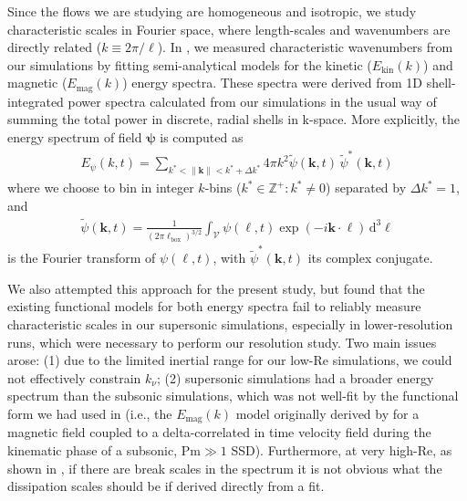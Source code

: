 \documentclass[12pt,twoside]{extreport}
\newcommand{\rbrac}[1]{\left( #1 \right)} %
\newcommand{\mVector}[1]{\bm{#1}} %
\newcommand{\mdd}[1]{\mathrm{d} #1}
\newcommand{\mReh}{\ensuremath{\mathrm{Re}}} %
\newcommand{\mPrm}{\ensuremath{\mathrm{Pm}}} %
\newcommand{\mVolume}{\ensuremath{\mathcal{V}}} %
\newcommand{\ie}{i.e.,\xspace} %
\providecommand{\DIFaddtex}[1]{{\protect\color{DIFgreen}\uwave{#1}}} %
\providecommand{\DIFaddbegin}{} %
\providecommand{\DIFaddend}{} %
\providecommand{\DIFadd}[1]{\texorpdfstring{\DIFaddtex{#1}}{#1}} %
\providecommand{\DIFaddincludegraphics}[2][]{{\color{DIFgreen}\fbox{\DIFOincludegraphics[#1]{#2}}}} %
\DeclareRobustCommand{\DIFaddbegin}{\DIFOaddbegin \let\includegraphics\DIFaddincludegraphics} %
\DeclareRobustCommand{\DIFaddend}{\DIFOaddend \let\includegraphics\DIFOincludegraphics} %
\begin{document}
Since the flows we are studying are homogeneous and isotropic, we study characteristic scales in Fourier space, where length-scales and wavenumbers are directly related ($k \equiv 2\pi / \ell$). In , we measured characteristic wavenumbers from our simulations by fitting semi-analytical models for the kinetic ($E_\mathrm{kin}(k)$) and magnetic ($E_\mathrm{mag}(k)$) energy spectra. These spectra were derived from 1D shell-integrated power spectra calculated from our simulations in the usual way of summing the total power in discrete, radial shells in k-space. More explicitly, the energy spectrum of field $\mVector{\psi}$ is computed as
\begin{align}
    E_\psi(k, t)
        = \sum_{k^* < \|\mVector{k}\| < k^* + \Delta k^*}
            4\pi k^2 \widetilde{\psi}(\mVector{k}, t) \, \widetilde{\psi}^*(\mVector{k}, t)
\end{align}
where we choose to bin in integer $k$-bins ($k^* \in \mathds{Z}^+ : k^* \ne 0$) separated by $\Delta k^* = 1$, and
\begin{align}
    \widetilde{\psi}(\mVector{k}, t)
        = \frac{1}{(2 \pi \ell_\mathrm{box})^{3/2}} \int_\mVolume \psi(\mVector{\ell}, t) \exp\rbrac{-i \mVector{k}\cdot\mVector{\ell}} \,\mdd{^3 \ell}
        \label{eqn:kin_fourier}
\end{align}
is the Fourier transform of $\psi(\mVector{\ell}, t)$, with $\widetilde{\psi}^*(\mVector{k}, t)$ its complex conjugate.

We also attempted this \DIFaddbegin \DIFadd{same model-fitting }\DIFaddend approach for the present study, but found that the existing functional models for both energy spectra fail to reliably measure characteristic scales in our supersonic simulations, especially in lower-resolution runs, which were necessary to perform our resolution study. Two main issues arose: (1) due to the limited inertial range for our low-$\mReh$ simulations, we could not effectively constrain $k_\nu$; (2) supersonic simulations had a broader energy spectrum than the subsonic simulations, which was not well-fit by the functional form we had used in  (\ie the $E_{\mathrm{mag}}(k)$ model originally derived by \citet{kulsrud1992spectrum} for a magnetic field coupled to a delta-correlated in time velocity field during the kinematic phase of a subsonic, $\mPrm \gg 1$ SSD). Furthermore, at very high-$\mReh$, as shown in \citet{Beattie2024_10k_MHD}, if there are break scales in the spectrum it is not obvious what the dissipation scales should be if derived directly from a fit.
\end{document}
